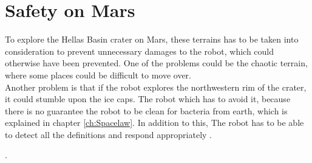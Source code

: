 \newpage
\section{Safety on Mars}
To explore the Hellas Basin crater on Mars, these terrains has to be taken into consideration to prevent unnecessary damages to the robot, which could otherwise have been prevented.
One of the problems could be the chaotic terrain, where some places could be difficult to move over.\\
Another problem is that if the robot explores the northwestern rim of the crater, it could stumble upon the ice caps. The robot which has to avoid it, because there is no guarantee the robot to be clean for bacteria from earth, which is explained in chapter \ref{ch:Spacelaw}. In addition to this, The robot has to be able to detect all the definitions and respond appropriately \cite{AspectsWeather}.




.





